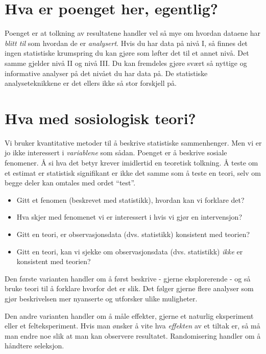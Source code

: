 \documentclass[
  letterpaper,
  DIV=11,
  numbers=noendperiod]{scrreprt}
\providecommand{\tightlist}{%
  \setlength{\itemsep}{0pt}\setlength{\parskip}{0pt}}\usepackage{longtable,booktabs,array}
\theoremstyle{definition}
\theoremstyle{remark}
\begin{document}
\hypertarget{hva-er-poenget-her-egentlig}{%
\section{Hva er poenget her,
egentlig?}\label{hva-er-poenget-her-egentlig}}

Poenget er at tolkning av resultatene handler vel så mye om hvordan
dataene har \emph{blitt til} som hvordan de er \emph{analysert}. Hvis du
har data på nivå I, så finnes det ingen statistiske krumspring du kan
gjøre som løfter det til et annet nivå. Det samme gjelder nivå II og
nivå III. Du kan fremdeles gjøre svært så nyttige og informative
analyser på det nivået du har data på. De statistiske analyseteknikkene
er det ellers ikke så stor forskjell på.

\hypertarget{hva-med-sosiologisk-teori}{%
\section{Hva med sosiologisk teori?}\label{hva-med-sosiologisk-teori}}

Vi bruker kvantitative metoder til å beskrive statistiske sammenhenger.
Men vi er jo ikke interessert i \emph{variablene} som sådan. Poenget er
å beskrive sosiale fenomener. Å si hva det betyr krever imidlertid en
teoretisk tolkning. Å teste om et estimat er statistisk signifikant er
ikke det samme som å teste en teori, selv om begge deler kan omtales med
ordet ``test''.

\begin{itemize}
\tightlist
\item
  Gitt et fenomen (beskrevet med statistikk), hvordan kan vi forklare
  det?
\item
  Hva skjer med fenomenet vi er interessert i hvis vi gjør en
  intervensjon?
\item
  Gitt en teori, er observasjonsdata (dvs. statistikk) konsistent med
  teorien?
\item
  Gitt en teori, kan vi sjekke om observasjonsdata (dvs. statistikk)
  \emph{ikke} er konsistent med teorien?
\end{itemize}

Den første varianten handler om å først beskrive - gjerne eksplorerende
- og så bruke teori til å forklare hvorfor det er slik. Det følger
gjerne flere analyser som gjør beskrivelsen mer nyanserte og utforsker
ulike muligheter.

Den andre varianten handler om å måle effekter, gjerne et naturlig
eksperiment eller et felteksperiment. Hvis man ønsker å vite hva
\emph{effekten} av et tiltak er, så må man endre noe slik at man kan
observere resultatet. Randomisering handler om å håndtere seleksjon.
\end{document}
